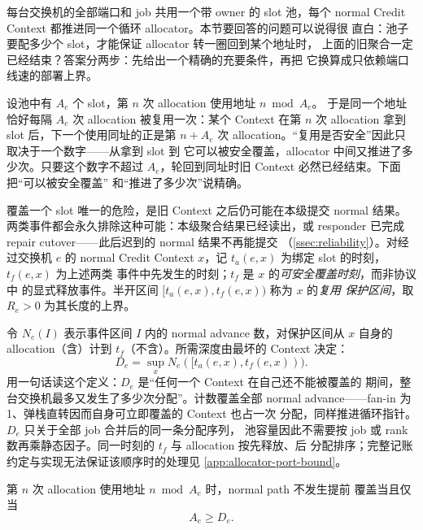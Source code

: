 每台交换机的全部端口和 job 共用一个带 owner 的 slot 池，每个 normal
Credit Context 都推进同一个循环 allocator。本节要回答的问题可以说得很
直白：池子要配多少个 slot，才能保证 allocator 转一圈回到某个地址时，
上面的旧聚合一定已经结束？答案分两步：先给出一个精确的充要条件，再把
它换算成只依赖端口线速的部署上界。

设池中有 $A_e$ 个 slot，第 $n$ 次 allocation 使用地址 $n\bmod A_e$。
于是同一个地址恰好每隔 $A_e$ 次 allocation 被复用一次：某个 Context
在第 $n$ 次 allocation 拿到 slot 后，下一个使用同址的正是第 $n+A_e$
次 allocation。``复用是否安全''因此只取决于一个数字——从拿到 slot 到
它可以被安全覆盖，allocator 中间又推进了多少次。只要这个数字不超过
$A_e$，轮回到同址时旧 Context 必然已经结束。下面把``可以被安全覆盖''
和``推进了多少次''说精确。

覆盖一个 slot 唯一的危险，是旧 Context 之后仍可能在本级提交 normal
结果。两类事件都会永久排除这种可能：本级聚合结果已经读出，或
responder 已完成 repair cutover——此后迟到的 normal 结果不再能提交
（\cref{ssec:reliability}）。对经过交换机 $e$ 的 normal Credit
Context $x$，记 $t_a(e,x)$ 为绑定 slot 的时刻，$t_f(e,x)$ 为上述两类
事件中先发生的时刻；$t_f$ 是 $x$ 的\emph{可安全覆盖时刻}，而非协议中
的显式释放事件。半开区间 $[t_a(e,x),t_f(e,x))$ 称为 $x$ 的\emph{复用
保护区间}，取 $R_e>0$ 为其长度的上界。

令 $N_e(I)$ 表示事件区间 $I$ 内的 normal advance 数，对保护区间从
$x$ 自身的 allocation（含）计到 $t_f$（不含）。所需深度由最坏的
Context 决定：
\begin{equation}
 D_e=\sup_x N_e([t_a(e,x),t_f(e,x))).
 \label{eq:allocator-exact-depth}
\end{equation}
用一句话读这个定义：$D_e$ 是``任何一个 Context 在自己还不能被覆盖的
期间，整台交换机最多又发生了多少次分配''。计数覆盖全部 normal
advance——fan-in 为 1、弹栈直转因而自身可立即覆盖的 Context 也占一次
分配，同样推进循环指针。$D_e$ 只关于全部 job 合并后的同一条分配序列，
池容量因此不需要按 job 或 rank 数再乘静态因子。同一时刻的 $t_f$ 与 allocation 按先释放、后
分配排序；完整记账约定与实现无法保证该顺序时的处理见
\cref{app:allocator-port-bound}。

\begin{theorem}
\label{thm:allocator-exact}
第 $n$ 次 allocation 使用地址 $n\bmod A_e$ 时，normal path 不发生提前
覆盖当且仅当
\begin{equation}
 A_e\geq D_e .
 \label{eq:allocator-exact-condition}
\end{equation}
\end{theorem}

